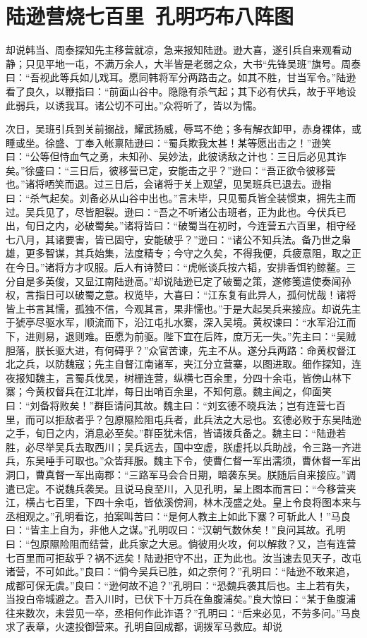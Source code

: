 \chapter{陆逊营烧七百里~孔明巧布八阵图}

却说韩当、周泰探知先主移营就凉，急来报知陆逊。逊大喜，遂引兵自来观看动静；只见平地一屯，不满万余人，大半皆是老弱之众，大书“先锋吴班”旗号。周泰曰：“吾视此等兵如儿戏耳。愿同韩将军分两路击之。如其不胜，甘当军令。”陆逊看了良久，以鞭指曰：“前面山谷中。隐隐有杀气起；其下必有伏兵，故于平地设此弱兵，以诱我耳。诸公切不可出。”众将听了，皆以为懦。

次日，吴班引兵到关前搦战，耀武扬威，辱骂不绝；多有解衣卸甲，赤身裸体，或睡或坐。徐盛、丁奉入帐禀陆逊曰：“蜀兵欺我太甚！某等愿出击之！”逊笑曰：“公等但恃血气之勇，未知孙、吴妙法，此彼诱敌之计也：三日后必见其诈矣。”徐盛曰：“三日后，彼移营已定，安能击之乎？”逊曰：“吾正欲令彼移营也。”诸将哂笑而退。过三日后，会诸将于关上观望，见吴班兵已退去。逊指曰：“杀气起矣。刘备必从山谷中出也。”言未毕，只见蜀兵皆全装惯束，拥先主而过。吴兵见了，尽皆胆裂。逊曰：“吾之不听诸公击班者，正为此也。今伏兵已出，旬日之内，必破蜀矣。”诸将皆曰：“破蜀当在初时，今连营五六百里，相守经七八月，其诸要害，皆已固守，安能破乎？”逊曰：“诸公不知兵法。备乃世之枭雄，更多智谋，其兵始集，法度精专；今守之久矣，不得我便，兵疲意阻，取之正在今日。”诸将方才叹服。后人有诗赞曰：“虎帐谈兵按六韬，安排香饵钓鲸鳌。三分自是多英俊，又显江南陆逊高。”却说陆逊已定了破蜀之策，遂修笺遣使奏闻孙权，言指日可以破蜀之意。权览毕，大喜曰：“江东复有此异人，孤何忧哉！诸将皆上书言其懦，孤独不信，今观其言，果非懦也。”于是大起吴兵来接应。却说先主于猇亭尽驱水军，顺流而下，沿江屯扎水寨，深入吴境。黄权谏曰：“水军沿江而下，进则易，退则难。臣愿为前驱。陛下宜在后阵，庶万无一失。”先主曰：“吴贼胆落，朕长驱大进，有何碍乎？”众官苦谏，先主不从。遂分兵两路：命黄权督江北之兵，以防魏寇；先主自督江南诸军，夹江分立营寨，以图进取。细作探知，连夜报知魏主，言蜀兵伐吴，树栅连营，纵横七百余里，分四十余屯，皆傍山林下寨；今黄权督兵在江北岸，每日出哨百余里，不知何意。魏主闻之，仰面笑曰：“刘备将败矣！”群臣请问其故。魏主曰：“刘玄德不晓兵法；岂有连营七百里，而可以拒敌者乎？包原隰险阻屯兵者，此兵法之大忌也。玄德必败于东吴陆逊之手，旬日之内，消息必至矣。”群臣犹未信，皆请拨兵备之。魏主曰：“陆逊若胜，必尽举吴兵去取西川；吴兵远去，国中空虚，朕虚托以兵助战，令三路一齐进兵，东吴唾手可取也。”众皆拜服。魏主下令，使曹仁督一军出濡须，曹休督一军出洞口，曹真督一军出南郡：“三路军马会合日期，暗袭东吴。朕随后自来接应。”调遣已定。不说魏兵袭吴。且说马良至川，入见孔明，呈上图本而言曰：“今移营夹江，横占七百里，下四十余屯，皆依溪傍涧，林木茂盛之处。皇上令良将图本来与丞相观之。”孔明看讫，拍案叫苦曰：“是何人教主上如此下寨？可斩此人！”马良曰：“皆主上自为，非他人之谋。”孔明叹曰：“汉朝气数休矣！”良问其故。孔明曰：“包原隰险阻而结营，此兵家之大忌。倘彼用火攻，何以解救？又，岂有连营七百里而可拒敌乎？祸不远矣！陆逊拒守不出，正为此也。汝当速去见天子，改屯诸营，不可如此。”良曰：“倘今吴兵已胜，如之奈何？”孔明曰：“陆逊不敢来追，成都可保无虞。”良曰：“逊何故不追？”孔明曰：“恐魏兵袭其后也。主上若有失，当投白帝城避之。吾入川时，已伏下十万兵在鱼腹浦矣。”良大惊曰：“某于鱼腹浦往来数次，未尝见一卒，丞相何作此诈语？”孔明曰：“后来必见，不劳多问。”马良求了表章，火速投御营来。孔明自回成都，调拨军马救应。却说